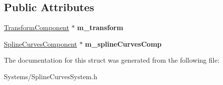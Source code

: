 \subsection*{Public Attributes}
\begin{DoxyCompactItemize}
\item 
\mbox{\label{structSplineCurvesCompNode_a61d2dbd87ea4a3db46dc87df9f1af990}} 
\hyperlink{classTransformComponent}{Transform\+Component} $\ast$ {\bfseries m\+\_\+transform}
\item 
\mbox{\label{structSplineCurvesCompNode_a8d8ae189fa027487a091103ffd2db949}} 
\hyperlink{classSplineCurvesComponent}{Spline\+Curves\+Component} $\ast$ {\bfseries m\+\_\+spline\+Curves\+Comp}
\end{DoxyCompactItemize}


The documentation for this struct was generated from the following file\+:\begin{DoxyCompactItemize}
\item 
Systems/Spline\+Curves\+System.\+h\end{DoxyCompactItemize}
